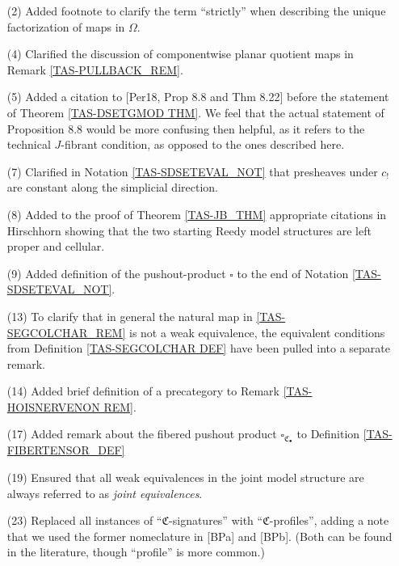 \documentclass[a4paper,10pt
]{article}%
\numberwithin{equation}{section}
\numberwithin{figure}{section}
\theoremstyle{definition} %
\newcommand{\1}{\ensuremath{\mathbbm 1}}%
\begin{document}
\begin{enumerate}
\item[(2)] Added footnote to clarify the term ``strictly'' when describing the unique factorization of maps in $\Omega$.
\item[(4)] Clarified the discussion of componentwise planar quotient maps in Remark \ref{TAS-PULLBACK_REM}.
\item[(5)] Added a citation to [Per18, Prop 8.8 and Thm 8.22] before the statement of Theorem \ref{TAS-DSETGMOD THM}.
        We feel that the actual statement of Proposition 8.8 would be more confusing then helpful, as it refers to the technical $J$-fibrant condition, as opposed to the ones described here.
\item[(7)] Clarified in Notation \ref{TAS-SDSETEVAL_NOT} that presheaves under $c_!$ are constant along the simplicial direction.
\item[(8)] Added to the proof of Theorem \ref{TAS-JB_THM} appropriate citations in Hirschhorn showing that the two starting Reedy model structures are left proper and cellular.
\item[(9)] Added definition of the pushout-product $\square$ to the end of Notation \ref{TAS-SDSETEVAL_NOT}.
\item[(13)] To clarify that in general the natural map in \ref{TAS-SEGCOLCHAR_REM} is not a weak equivalence, the equivalent conditions from Definition \ref{TAS-SEGCOLCHAR DEF} have been pulled into a separate remark.
\item[(14)] Added brief definition of a precategory to Remark \ref{TAS-HOISNERVENON REM}.
\item[(17)] Added remark about the fibered pushout product $\square_{\mathfrak C_\bullet}$ to Definition \ref{TAS-FIBERTENSOR_DEF}
\item[(19)] Ensured that all weak equivalences in the joint model structure are always referred to as \textit{joint equivalences}.
\item[(23)] Replaced all instances of ``$\mathfrak C$-signatures'' with ``$\mathfrak C$-profiles'', adding a note that we used the former nomeclature in [BPa] and [BPb].
        (Both can be found in the literature, though ``profile'' is more common.)

\end{enumerate}
\end{document}
